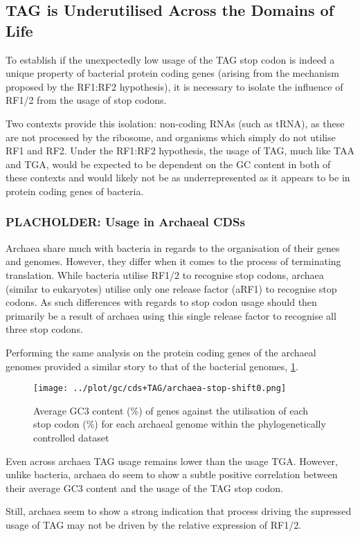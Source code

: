 \documentclass[../main.tex]{subfile}
\begin{document}
    \subsection{TAG is Underutilised Across the Domains of Life}
        To establish if the unexpectedly low usage of the TAG stop codon is indeed a unique property of bacterial protein coding genes (arising from the mechanism proposed by the RF1:RF2 hypothesis), it is necessary to isolate the influence of RF1/2 from the usage of stop codons.

        Two contexts provide this isolation: non-coding RNAs (such as tRNA), as these are not processed by the ribosome, and organisms which simply do not utilise RF1 and RF2. Under the RF1:RF2 hypothesis, the usage of TAG, much like TAA and TGA, would be expected to be dependent on the GC content in both of these contexts and would likely not be as underrepresented as it appears to be in protein coding genes of bacteria.

        \subsubsection{PLACHOLDER: Usage in Archaeal CDSs}
            Archaea share much with bacteria in regards to the organisation of their genes and genomes. However, they differ when it comes to the process of terminating translation. While bacteria utilise RF1/2 to recognise stop codons, archaea (similar to eukaryotes) utilise only one release factor (aRF1) to recognise stop codons. As such differences with regards to stop codon usage should then primarily be a result of archaea using this single release factor to recognise all three stop codons.

            Performing the same analysis on the protein coding genes of the archaeal genomes provided a similar story to that of the bacterial genomes, \cref{fig:stopUsage/archaea}.

            \begin{figure}[H]
                \centering
                \texttt{[image: ../plot/gc/cds+TAG/archaea-stop-shift0.png]}
                \caption{%
                    Average GC3 content (\%) of genes against the utilisation of each stop codon (\%) for each archaeal genome within the phylogenetically controlled dataset
                }
                \label{fig:stopUsage/archaea}
            \end{figure}

            Even across archaea TAG usage remains lower than the usage TGA. However, unlike bacteria, archaea do seem to show a subtle positive correlation between their average GC3 content and the usage of the TAG stop codon.

            Still, archaea seem to show a strong indication that process driving the supressed usage of TAG may not be driven by the relative expression of RF1/2.
\end{document}
